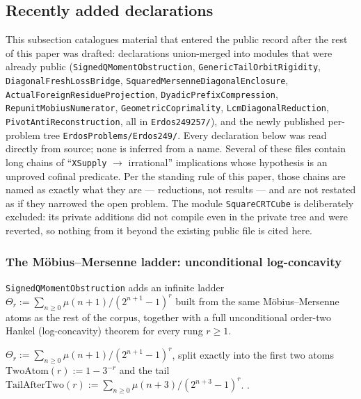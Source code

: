 \subsection{Recently added declarations}

This subsection catalogues material that entered the public record after the
rest of this paper was drafted: declarations union-merged into modules that
were already public (\texttt{SignedQMomentObstruction},
\texttt{GenericTailOrbitRigidity}, \texttt{DiagonalFreshLossBridge},
\texttt{SquaredMersenneDiagonalEnclosure},
\texttt{ActualForeignResidueProjection}, \texttt{DyadicPrefixCompression},
\texttt{RepunitMobiusNumerator}, \texttt{GeometricCoprimality},
\texttt{LcmDiagonalReduction}, \texttt{PivotAntiReconstruction}, all in
\texttt{Erdos249257/}), and the newly published per-problem tree
\texttt{ErdosProblems/Erdos249/}. Every declaration below was read directly
from source; none is inferred from a name. Several of these files contain
long chains of ``\texttt{XSupply} $\to$ irrational'' implications whose
hypothesis is an unproved cofinal predicate. Per the standing rule of this
paper, those chains are named as exactly what they are --- reductions, not
results --- and are not restated as if they narrowed the open problem. The
module \texttt{SquareCRTCube} is deliberately excluded: its private additions
did not compile even in the private tree and were reverted, so nothing from
it beyond the existing public file is cited here.

\subsubsection{The Möbius--Mersenne ladder: unconditional log-concavity}

\texttt{SignedQMomentObstruction} adds an infinite ladder
$\Theta_r := \sum_{n\ge 0} \mu(n+1)/(2^{n+1}-1)^r$ built from the same
Möbius--Mersenne atoms as the rest of the corpus, together with a full
unconditional order-two Hankel (log-concavity) theorem for every rung $r\ge 1$.

\begin{defn}
$\Theta_r := \sum_{n\ge 0}\mu(n+1)/(2^{n+1}-1)^r$, split exactly into the
first two atoms $\mathrm{TwoAtom}(r) := 1 - 3^{-r}$ and the tail
$\mathrm{TailAfterTwo}(r) := \sum_{n\ge 0}\mu(n+3)/(2^{n+3}-1)^r$.
\quad {}
\quad {}
\quad {} \quad {} \quad {}.
\end{defn}

